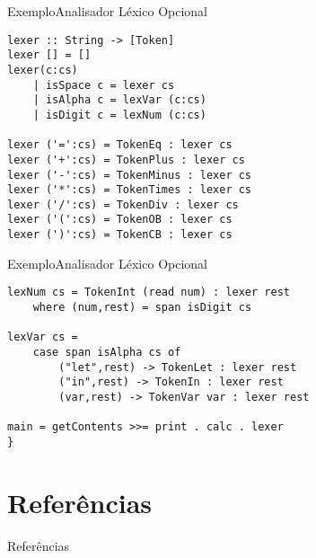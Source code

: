 \documentclass[hyperref={pdfpagelabels=false}]{beamer}
\begin{document}
\begin{frame}[fragile]{Exemplo}{Analisador Léxico Opcional}
\begin{verbatim}
lexer :: String -> [Token]
lexer [] = []
lexer(c:cs)
    | isSpace c = lexer cs
    | isAlpha c = lexVar (c:cs)
    | isDigit c = lexNum (c:cs)

lexer ('=':cs) = TokenEq : lexer cs
lexer ('+':cs) = TokenPlus : lexer cs
lexer ('-':cs) = TokenMinus : lexer cs
lexer ('*':cs) = TokenTimes : lexer cs
lexer ('/':cs) = TokenDiv : lexer cs
lexer ('(':cs) = TokenOB : lexer cs
lexer (')':cs) = TokenCB : lexer cs
\end{verbatim}
\end{frame}

\begin{frame}[fragile]{Exemplo}{Analisador Léxico Opcional}
\begin{verbatim}
lexNum cs = TokenInt (read num) : lexer rest
    where (num,rest) = span isDigit cs

lexVar cs =
    case span isAlpha cs of
        ("let",rest) -> TokenLet : lexer rest
        ("in",rest) -> TokenIn : lexer rest
        (var,rest) -> TokenVar var : lexer rest

main = getContents >>= print . calc . lexer
}
\end{verbatim}
\end{frame}

\section{Referências}

\begin{frame}{Referências}
    
    
\end{frame}
\end{document}
